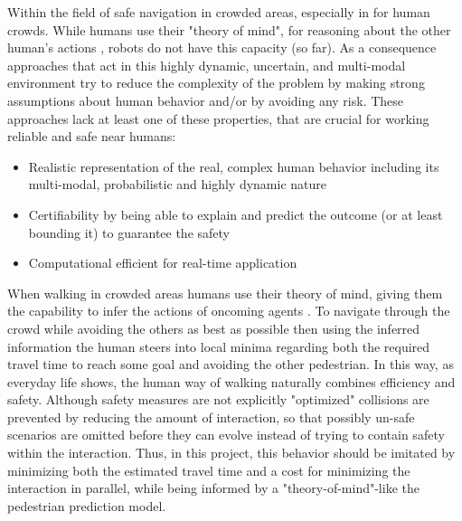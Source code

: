Within the field of safe navigation in crowded areas, especially in for human crowds. While humans use their "theory of mind", for reasoning about the other human's actions \cite{Gweon2013}, robots do not have this capacity (so far). As a consequence approaches that act in this highly dynamic, uncertain, and multi-modal environment try to reduce the complexity of the problem by making strong assumptions about human behavior and/or by avoiding any risk. These approaches lack at least one of these properties, that are crucial for working reliable and safe near humans: 

\begin{itemize}
\item Realistic representation of the real, complex human behavior including its multi-modal, probabilistic and highly dynamic nature
\item Certifiability by being able to explain and predict the outcome (or at least bounding it) to guarantee the safety 
\item Computational efficient for real-time application
\end{itemize}

When walking in crowded areas humans use their theory of mind, giving them the capability to infer the actions of oncoming agents \cite{Ivanovic2018} \cite{Gweon2013}. To navigate through the crowd while avoiding the others as best as possible then using the inferred information the human steers into local minima regarding both the required travel time to reach some goal and avoiding the other pedestrian. In this way, as everyday life shows, the human way of walking naturally combines efficiency and safety. Although safety measures are not explicitly "optimized" collisions are prevented by reducing the amount of interaction, so that possibly un-safe scenarios are omitted before they can evolve instead of trying to contain safety within the interaction. Thus, in this project, this behavior should be imitated by minimizing both the estimated travel time and a cost for minimizing the interaction in parallel, while being informed by a "theory-of-mind"-like the pedestrian prediction model. 



